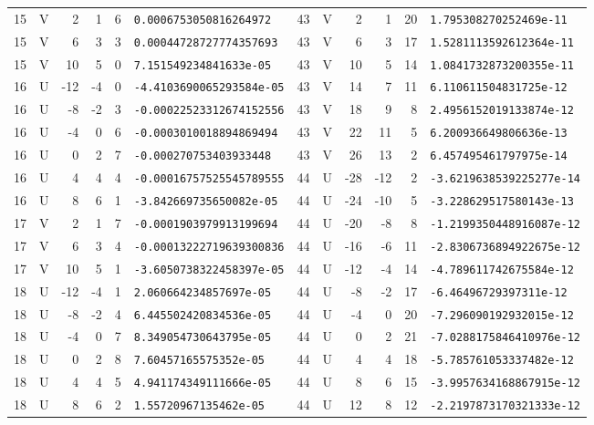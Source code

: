 \begin{longtable}{rcrrrl|rcrrrl}
15 & V & 2 & 1 & 6 & \texttt{0.0006753050816264972} & 43 & V & 2 & 1 & 20 & \texttt{1.795308270252469e-11}\\
15 & V & 6 & 3 & 3 & \texttt{0.00044728727774357693} & 43 & V & 6 & 3 & 17 & \texttt{1.5281113592612364e-11}\\
15 & V & 10 & 5 & 0 & \texttt{7.151549234841633e-05} & 43 & V & 10 & 5 & 14 & \texttt{1.0841732873200355e-11}\\
16 & U & -12 & -4 & 0 & \texttt{-4.4103690065293584e-05} & 43 & V & 14 & 7 & 11 & \texttt{6.110611504831725e-12}\\
16 & U & -8 & -2 & 3 & \texttt{-0.00022523312674152556} & 43 & V & 18 & 9 & 8 & \texttt{2.4956152019133874e-12}\\
16 & U & -4 & 0 & 6 & \texttt{-0.0003010018894869494} & 43 & V & 22 & 11 & 5 & \texttt{6.200936649806636e-13}\\
16 & U & 0 & 2 & 7 & \texttt{-0.000270753403933448} & 43 & V & 26 & 13 & 2 & \texttt{6.457495461797975e-14}\\
16 & U & 4 & 4 & 4 & \texttt{-0.00016757525545789555} & 44 & U & -28 & -12 & 2 & \texttt{-3.6219638539225277e-14}\\
16 & U & 8 & 6 & 1 & \texttt{-3.842669735650082e-05} & 44 & U & -24 & -10 & 5 & \texttt{-3.228629517580143e-13}\\
17 & V & 2 & 1 & 7 & \texttt{-0.0001903979913199694} & 44 & U & -20 & -8 & 8 & \texttt{-1.2199350448916087e-12}\\
17 & V & 6 & 3 & 4 & \texttt{-0.00013222719639300836} & 44 & U & -16 & -6 & 11 & \texttt{-2.8306736894922675e-12}\\
17 & V & 10 & 5 & 1 & \texttt{-3.6050738322458397e-05} & 44 & U & -12 & -4 & 14 & \texttt{-4.789611742675584e-12}\\
18 & U & -12 & -4 & 1 & \texttt{2.060664234857697e-05} & 44 & U & -8 & -2 & 17 & \texttt{-6.46496729397311e-12}\\
18 & U & -8 & -2 & 4 & \texttt{6.445502420834536e-05} & 44 & U & -4 & 0 & 20 & \texttt{-7.296090192932015e-12}\\
18 & U & -4 & 0 & 7 & \texttt{8.349054730643795e-05} & 44 & U & 0 & 2 & 21 & \texttt{-7.0288175846410976e-12}\\
18 & U & 0 & 2 & 8 & \texttt{7.60457165575352e-05} & 44 & U & 4 & 4 & 18 & \texttt{-5.785761053337482e-12}\\
18 & U & 4 & 4 & 5 & \texttt{4.941174349111666e-05} & 44 & U & 8 & 6 & 15 & \texttt{-3.9957634168867915e-12}\\
18 & U & 8 & 6 & 2 & \texttt{1.55720967135462e-05} & 44 & U & 12 & 8 & 12 & \texttt{-2.2197873170321333e-12}\\

\end{longtable}

